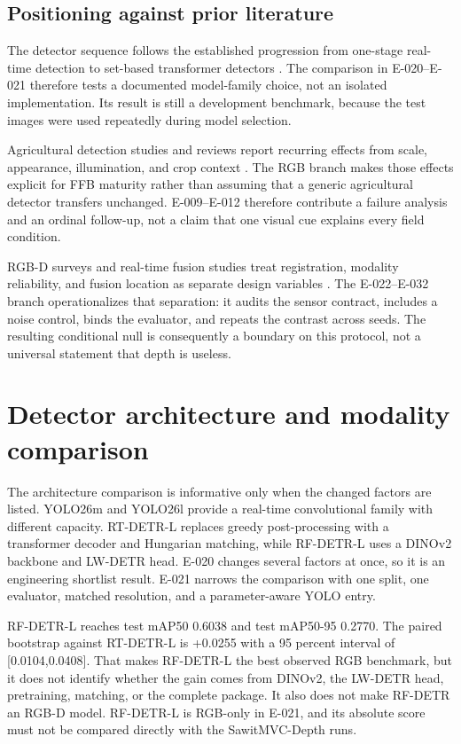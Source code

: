 \documentclass[preprint,12pt]{elsarticle}
\begin{document}
\subsection{Positioning against prior literature}
The detector sequence follows the established progression from one-stage
real-time detection to set-based transformer detectors
\cite{redmon2016yolo,carion2020detr,zhao2024rtdetr,robinson2025rfdetr}. The
comparison in E-020--E-021 therefore tests a documented model-family choice,
not an isolated implementation. Its result is still a development benchmark,
because the test images were used repeatedly during model selection.

Agricultural detection studies and reviews report recurring effects from scale,
appearance, illumination, and crop context
\cite{sapkota2024yoloagri,genemola2020fruit3d,kang2020strawberry}. The RGB
branch makes those effects explicit for FFB maturity rather than assuming that
a generic agricultural detector transfers unchanged. E-009--E-012 therefore
contribute a failure analysis and an ordinal follow-up, not a claim that one
visual cue explains every field condition.

RGB-D surveys and real-time fusion studies treat registration, modality
reliability, and fusion location as separate design variables
\cite{feng2021multimodalsurvey,zhou2021rgbdsurvey,ophoff2019multimodal,zhang2023cmx}.
The E-022--E-032 branch operationalizes that separation: it audits the sensor
contract, includes a noise control, binds the evaluator, and repeats the
contrast across seeds. The resulting conditional null is consequently a
boundary on this protocol, not a universal statement that depth is useless.

\section{Detector architecture and modality comparison}
\label{sec:architecture-comparison}
The architecture comparison is informative only when the changed factors are
listed. YOLO26m and YOLO26l provide a real-time convolutional family with
different capacity. RT-DETR-L replaces greedy post-processing with a
transformer decoder and Hungarian matching, while RF-DETR-L uses a DINOv2
backbone and LW-DETR head. E-020 changes several factors at once, so it is an
engineering shortlist result. E-021 narrows the comparison with one split,
one evaluator, matched resolution, and a parameter-aware YOLO entry.

RF-DETR-L reaches test mAP50 0.6038 and test mAP50-95 0.2770. The paired
bootstrap against RT-DETR-L is +0.0255 with a 95 percent interval of
[0.0104,0.0408]. That makes RF-DETR-L the best observed RGB benchmark, but it
does not identify whether the gain comes from DINOv2, the LW-DETR head,
pretraining, matching, or the complete package. It also does not make RF-DETR
an RGB-D model. RF-DETR-L is RGB-only in E-021, and its absolute score must
not be compared directly with the SawitMVC-Depth runs.
\end{document}
